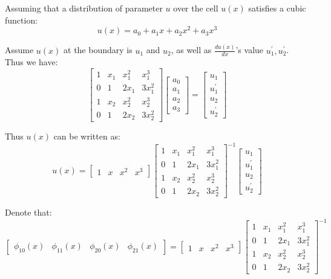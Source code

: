 Assuming that a distribution of parameter $u$ over the cell $u(x)$ satisfies a cubic function:
\begin{equation}
    u(x)=a_0+a_1x+a_2x^2+a_3x^3
\end{equation}

Assume $u(x)$ at the boundary is $u_1$ and $u_2$, as well as $\frac{du(x)}{dx}$'s value $u_1^\prime, u_2^\prime$. 
Thus we have:
\begin{equation}
    \begin{bmatrix}
        1&x_1&x_1^2&x_1^3\\
        0&1&2x_1&3x_1^2\\
        1&x_2&x_2^2&x_2^3\\
        0&1&2x_2&3x_2^2
    \end{bmatrix}
    \begin{bmatrix}
        a_0\\a_1\\a_2\\a_3
    \end{bmatrix}
    =
    \begin{bmatrix}
        u_1\\u_1^\prime\\u_2\\u_2^\prime
    \end{bmatrix}
\end{equation}

Thus $u(x)$ can be written as:
\begin{equation}
    u(x)=
    \begin{bmatrix}
        1&x&x^2&x^3
    \end{bmatrix}
    \begin{bmatrix}
        1&x_1&x_1^2&x_1^3\\
        0&1&2x_1&3x_1^2\\
        1&x_2&x_2^2&x_2^3\\
        0&1&2x_2&3x_2^2
    \end{bmatrix}^{-1}
    \begin{bmatrix}
        u_1\\u_1^\prime\\u_2\\u_2^\prime
    \end{bmatrix}
\end{equation}

Denote that:
\begin{equation}
    \begin{bmatrix}
        \phi_{10}(x)&
        \phi_{11}(x)&
        \phi_{20}(x)&
        \phi_{21}(x)
    \end{bmatrix}=
    \begin{bmatrix}
        1&x&x^2&x^3
    \end{bmatrix}
    \begin{bmatrix}
        1&x_1&x_1^2&x_1^3\\
        0&1&2x_1&3x_1^2\\
        1&x_2&x_2^2&x_2^3\\
        0&1&2x_2&3x_2^2
    \end{bmatrix}^{-1}
\end{equation}

